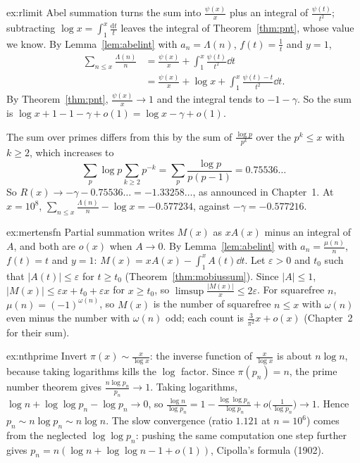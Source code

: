 \begin{solution}{ex:rlimit}
\idea Abel summation turns the sum into $\frac{\psi(x)}x$ plus an integral of $\frac{\psi(t)}{t^2}$; subtracting $\log x=\int_1^x\frac{\mathrm dt}t$ leaves the integral of Theorem~\ref{thm:pnt}, whose value we know.
\writeup By Lemma~\ref{lem:abelint} with $a_n=\Lambda(n)$, $f(t)=\frac1t$ and $y=1$,
\[
\begin{aligned}\sum_{n\le x}\frac{\Lambda(n)}n&=\frac{\psi(x)}x+\int_1^x\frac{\psi(t)}{t^2}\dd t\\&=\frac{\psi(x)}x+\log x+\int_1^x\frac{\psi(t)-t}{t^2}\dd t.\end{aligned}
\]
By Theorem~\ref{thm:pnt}, $\frac{\psi(x)}x\to1$ and the integral tends to $-1-\gamma$. So the sum is $\log x+1-1-\gamma+o(1)=\log x-\gamma+o(1)$.

The sum over primes differs from this by the sum of $\frac{\log p}{p^k}$ over the $p^k\le x$ with $k\ge2$, which increases to
\[
\sum_p\log p\sum_{k\ge2}p^{-k}=\sum_p\frac{\log p}{p(p-1)}=0.75536\ldots
\]
So
$R(x)\to-\gamma-0.75536\ldots=-1.33258\ldots$, as announced in Chapter~1. At $x=10^8$, $\sum_{n\le x}\frac{\Lambda(n)}n-\log x=-0.577234$, against $-\gamma=-0.577216$.
\end{solution}

\begin{solution}{ex:mertensfn}
\idea Partial summation writes $M(x)$ as $xA(x)$ minus an integral of $A$, and both are $o(x)$ when $A\to0$.
\writeup By Lemma~\ref{lem:abelint} with $a_n=\frac{\mu(n)}n$, $f(t)=t$ and $y=1$: $M(x)=xA(x)-\int_1^xA(t)\dd t$. Let $\varepsilon>0$ and $t_0$ such that $|A(t)|\le\varepsilon$ for $t\ge t_0$
(Theorem~\ref{thm:mobiussum}). Since $|A|\le1$, $|M(x)|\le\varepsilon x+t_0+\varepsilon x$ for $x\ge t_0$, so $\limsup\frac{|M(x)|}x\le2\varepsilon$. For squarefree $n$, $\mu(n)=(-1)^{\omega(n)}$, so $M(x)$
is the number of squarefree $n\le x$ with $\omega(n)$ even minus the number with $\omega(n)$ odd; each count is $\frac3{\pi^2}x+o(x)$ (Chapter~2 for their sum).
\end{solution}

\begin{solution}{ex:nthprime}
\idea Invert $\pi(x)\sim\frac x{\log x}$: the inverse function of $\frac x{\log x}$ is about $n\log n$, because taking logarithms kills the $\log$ factor.
\writeup Since $\pi(p_n)=n$, the prime number theorem gives $\frac{n\log p_n}{p_n}\to1$. Taking logarithms, $\log n+\log\log p_n-\log p_n\to0$, so
$\frac{\log n}{\log p_n}=1-\frac{\log\log p_n}{\log p_n}+o\bigl(\frac1{\log p_n}\bigr)\to1$. Hence $p_n\sim n\log p_n\sim n\log n$. The slow convergence (ratio $1.121$ at $n=10^6$) comes from the
neglected $\log\log p_n$: pushing the same computation one step further gives $p_n=n(\log n+\log\log n-1+o(1))$, Cipolla's formula (1902).
\end{solution}

